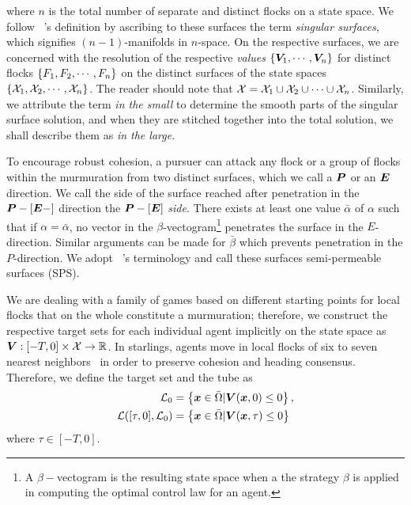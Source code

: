 %
where $n$ is the total number of separate and distinct flocks on a state space. We follow ~\cite{Isaacs1965}'s definition by ascribing to these surfaces the term \textit{singular surfaces}, which signifies $(n-1)$-manifolds in $n$-space.  On the respective surfaces, we are concerned with the resolution of the respective \textit{values} \ie  $\{\bm{V}_1, \cdots, \bm{V}_n\}$  for distinct flocks $\{F_1, F_2, \cdots, F_n\}$ on the distinct surfaces of the state spaces $\{\mathcal{X}_1, \mathcal{X}_2, \cdots, \mathcal{X}_n\}$. The reader should note that $\mathcal{X} = \mathcal{X}_1 \cup \mathcal{X}_2 \cup \cdots \cup \mathcal{X}_n$. %
Similarly, we  attribute the term \textit{in the small} to determine the smooth parts of the singular surface solution, and when they are stitched together into the total solution, we shall describe them as \textit{in the large}. 


To encourage robust cohesion, a pursuer can attack any flock or a group of flocks within the murmuration from two distinct surfaces, which we call a $\bm{P}$ or an $\bm{E}$ direction. We call the side of the surface reached after penetration in the $\bm{P}-[\bm{E}-]$ direction the $\bm{P}-[\bm{E}]$ \textit{side}. %
There exists at least one value $\bar{\alpha}$ of $\alpha$ such that if $\alpha = \bar{\alpha}$, no vector in the $\beta$-vectogram\footnote{A $\beta-$vectogram is the resulting state space when a the strategy $\beta$ is applied in computing the optimal control law for an agent.} penetrates the surface in the $E$-direction. Similar arguments can be made for $\bar{\beta}$ which prevents penetration in the $P$-direction. We adopt ~\cite{Isaacs1965}'s terminology and call these surfaces semi-permeable surfaces (SPS).

We are dealing with a family of games based on different starting points for local flocks that on the whole constitute a murmuration; therefore, we construct the respective target sets for each individual agent  implicitly on the state space as $\bm{V}: [-T, 0]\times \mathcal{X} \rightarrow \mathbb{R}$. In starlings, agents move in local flocks of six to seven nearest neighbors~\cite{Ballerini1232} in order to preserve cohesion and heading consensus. Therefore, we define the target set and the tube as
%
\begin{align}
\mathcal{L}_0 &= \left\{ \bm{x} \in \bar{\Omega} | \bm{V}(\bm{x}, 0) \le 0 \right\}, \\
\mathcal{L}([\tau, 0],  \mathcal{L}_0) &= \left\{\bm{x}\in \bar{\Omega}  | \bm{V}(\bm{x}, \tau) \le 0\right\}
\end{align}
%
where $\tau \in  [-T, 0]$. %
%

